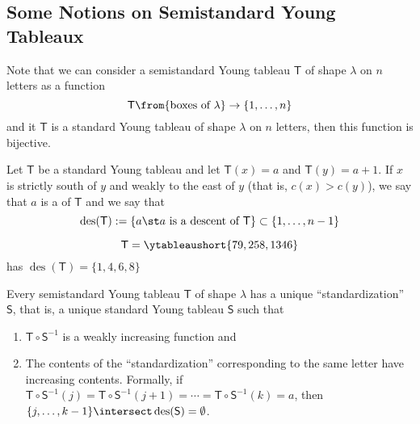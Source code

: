 \documentclass[11pt,leqno,oneside]{amsart}
\numberwithin{thm}{section}
\newcommand{\T}{\mathsf{T}} %
\renewcommand{\S}{\mathsf{S}}
\newcommand{\des}{\operatorname{des}}
\begin{document}
\subsection{Some Notions on Semistandard Young Tableaux}
Note that we can consider a semistandard Young tableau \(\T\) of shape
\(\lambda\) on \(n\) letters as a
function \[
  \T \from \{\text{boxes of }\lambda\} \to \{1,\ldots,n\}
\]
and it \(\T\) is a standard Young tableau of shape \(\lambda\) on
\(n\) letters, then this function is bijective.
\begin{defn}
  Let \(\T\) be a standard Young tableau and let \(\T(x) = a\) and
  \(\T(y) = a+1\). If \(x\) is strictly south of \(y\) and weakly to
  the east of \(y\) (that is, \(c(x) > c(y)\)), we say that
  \(a\) is a  of 
  \(\T\) and we say that \[
    \des(\T) := \{a \st a \text{ is a descent of }\T\} \subset
    \{1,\ldots, n-1\}
  \]
\end{defn}
\begin{example}
  \[
    \T = \ytableaushort{79,258,1346}
  \]
  has \(\des(\T) = \{1,4,6,8\}\)
\end{example}
\begin{prop}
  Every semistandard Young tableau \(\T\) of shape \(\lambda\) has a unique
  ``standardization'' \(\S\), that is, a unique standard Young tableau
  \(\S\) such that
  \begin{enumerate}
  \item \(\T \circ \S^{-1}\) is a weakly increasing function and
  \item The contents of the ``standardization'' corresponding to the
    same letter have increasing contents. Formally, if \(\T \circ
    \S^{-1}(j) = \T \circ \S^{-1}(j+1) = \cdots = \T 
    \circ \S^{-1}(k) = a\), then \(\{j, \ldots, k-1\} \intersect \des(\S)
    = \emptyset\).
  \end{enumerate}
\end{prop}
\end{document}
